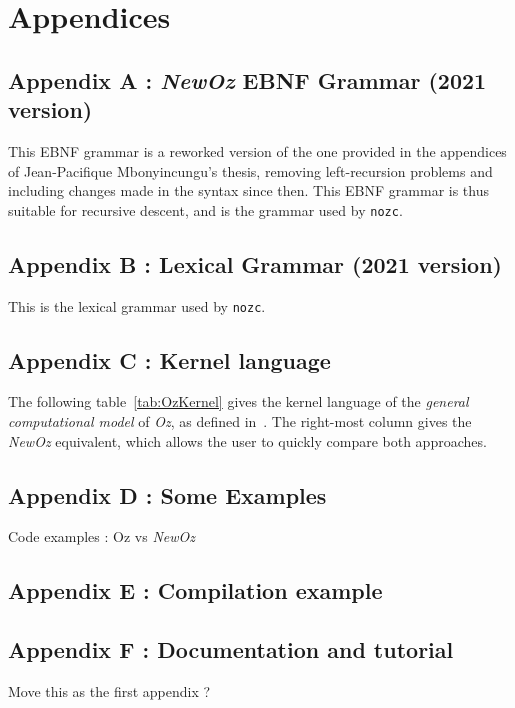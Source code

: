 
\appendix
\chapter*{Appendices}
\renewcommand{\thesection}{\Alph{section}}

\section{Appendix A : \textit{NewOz} EBNF Grammar (2021 version)}\label{sec:appendix-grammar}
This EBNF grammar is a reworked version of the one provided in the appendices of Jean-Pacifique Mbonyincungu's thesis,
removing left-recursion problems and including changes made in the syntax since then.\newline
This EBNF grammar is thus suitable for recursive descent, and is the grammar used by \texttt{nozc}.


\section{Appendix B : Lexical Grammar (2021 version)}\label{sec:appendix-lexical-grammar}
This is the lexical grammar used by \texttt{nozc}.


\section{Appendix C : Kernel language}\label{sec:appendix-kernel}
The following table~\ref{tab:OzKernel} gives the kernel language of the \textit{general computational model} of \textit{Oz}, as defined in~\cite{van2004concepts}.
The right-most column gives the \textit{NewOz} equivalent, which allows the user to quickly compare both approaches.


\section{Appendix D : Some Examples}\label{sec:appendix-examples}
Code examples : Oz vs \textit{NewOz}


\section{Appendix E : Compilation example}\label{sec:appendix-compilation}

\section{Appendix F : Documentation and tutorial}\label{sec:appendix-doc}
Move this as the first appendix ?